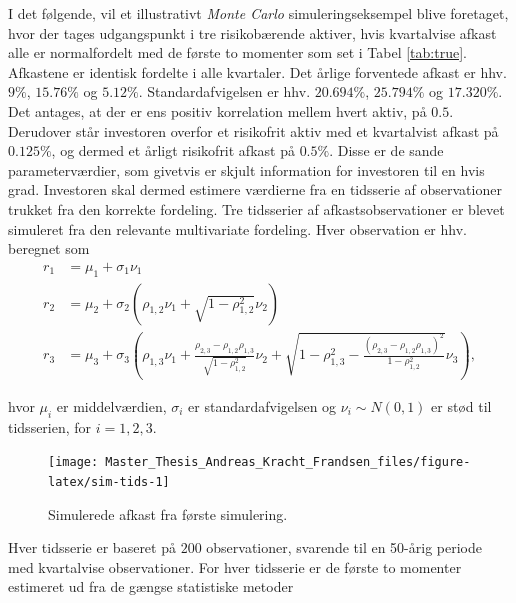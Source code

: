 \documentclass[
  a4paper,
  oneside]{memoir}
\begin{document}
I det følgende, vil et illustrativt \emph{Monte Carlo} simuleringseksempel blive foretaget, hvor der tages udgangspunkt i tre risikobærende aktiver, hvis kvartalvise afkast alle er normalfordelt med de første to momenter som set i Tabel \ref{tab:true}. Afkastene er identisk fordelte i alle kvartaler. Det årlige forventede afkast er hhv. \(9\%\), \(15.76\%\) og \(5.12\%\). Standardafvigelsen er hhv. \(20.694\%\), \(25.794\%\) og \(17.320\%\). Det antages, at der er ens positiv korrelation mellem hvert aktiv, på \(0.5\). Derudover står investoren overfor et risikofrit aktiv med et kvartalvist afkast på \(0.125\%\), og dermed et årligt risikofrit afkast på \(0.5\%\). Disse er de sande parameterværdier, som givetvis er skjult information for investoren til en hvis grad. Investoren skal dermed estimere værdierne fra en tidsserie af observationer trukket fra den korrekte fordeling. Tre tidsserier af afkastsobservationer er blevet simuleret fra den relevante multivariate fordeling. Hver observation er hhv. beregnet som
\begin{align*}
r_1 &= \mu_1 + \sigma_1\nu_1\\
r_2 &= \mu_2 + \sigma_2\left(\rho_{1,2}\nu_1 + \sqrt{1-\rho_{1,2}^2}\nu_2\right)\\
r_3 &= \mu_3 + \sigma_3 \left( \rho_{1,3} \nu_1+ \frac{ \rho_{2,3}-\rho_{1,2}\rho_{1,3} }{\sqrt{1-\rho_{1,2}^2}}\nu_2+\sqrt{1-\rho_{1,3}^2 -\frac{\left(\rho_{2,3}-\rho_{1,2}\rho_{1,3}\right)^2}{1-\rho_{1,2}^2}}\nu_3\right),
\end{align*}

hvor \(\mu_i\) er middelværdien, \(\sigma_i\) er standardafvigelsen og \(\nu_i\sim N(0,1)\) er stød til tidsserien, for \(i=1,2,3\).

\begin{figure}[htbp!]

{\centering \texttt{[image: Master\_Thesis\_Andreas\_Kracht\_Frandsen\_files/figure-latex/sim-tids-1]} 

}

\caption{Simulerede afkast fra første simulering.}\label{fig:sim-tids}
\end{figure}

Hver tidsserie er baseret på \(200\) observationer, svarende til en 50-årig periode med kvartalvise observationer. For hver tidsserie er de første to momenter estimeret ud fra de gængse statistiske metoder
\end{document}
